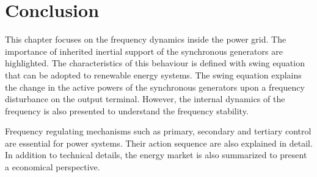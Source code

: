 \section{Conclusion}
This chapter focuses on the frequency dynamics inside the power grid. The importance of inherited inertial support of the synchronous generators are highlighted. The characteristics of this behaviour is defined with swing equation that can be adopted to renewable energy systems. The swing equation explains the change in the active powers of the synchronous generators upon a frequency disturbance on the output terminal. However, the internal dynamics of the frequency is also presented to understand the frequency stability. \par
Frequency regulating mechanisms such as primary, secondary and tertiary control are essential for power systems. Their action sequence are also explained in detail. In addition to technical details, the energy market is also summarized to present a economical perspective. 